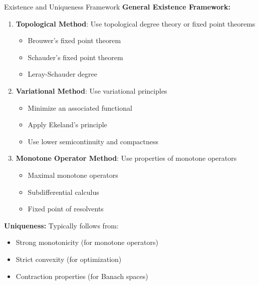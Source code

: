 \documentclass[aspectratio=169,10pt]{beamer}
\begin{document}
\begin{frame}{Existence and Uniqueness Framework}
  \textbf{General Existence Framework:}

  \begin{enumerate}
    \item \textbf{Topological Method}: Use topological degree theory or fixed point theorems
      \begin{itemize}
        \item Brouwer's fixed point theorem
        \item Schauder's fixed point theorem
        \item Leray-Schauder degree
      \end{itemize}

    \vspace{0.3cm}

    \item \textbf{Variational Method}: Use variational principles
      \begin{itemize}
        \item Minimize an associated functional
        \item Apply Ekeland's principle
        \item Use lower semicontinuity and compactness
      \end{itemize}

    \vspace{0.3cm}

    \item \textbf{Monotone Operator Method}: Use properties of monotone operators
      \begin{itemize}
        \item Maximal monotone operators
        \item Subdifferential calculus
        \item Fixed point of resolvents
      \end{itemize}
  \end{enumerate}

  \vspace{0.3cm}

  \textbf{Uniqueness:} Typically follows from:
  \begin{itemize}
    \item Strong monotonicity (for monotone operators)
    \item Strict convexity (for optimization)
    \item Contraction properties (for Banach spaces)
  \end{itemize}
\end{frame}
\end{document}
